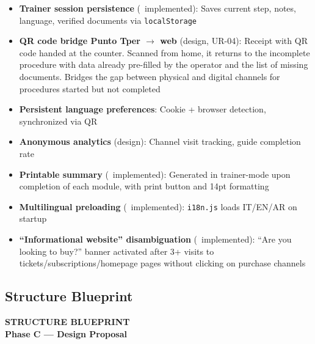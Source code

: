 ﻿\documentclass[11pt,a4paper]{article}
\begin{document}
\begin{tcolorbox}[rffield]
\small
\begin{itemize}[nosep]
  \item \textbf{Trainer session persistence} (\checkmark\ implemented): Saves current step, notes, language, verified documents via \texttt{localStorage}
  \item \textbf{QR code bridge Punto Tper $\rightarrow$ web} (design, UR-04): Receipt with QR code handed at the counter. Scanned from home, it returns to the incomplete procedure with data already pre-filled by the operator and the list of missing documents. Bridges the gap between physical and digital channels for procedures started but not completed
  \item \textbf{Persistent language preferences}: Cookie + browser detection, synchronized via QR
  \item \textbf{Anonymous analytics} (design): Channel visit tracking, guide completion rate
  \item \textbf{Printable summary} (\checkmark\ implemented): Generated in trainer-mode upon completion of each module, with print button and 14pt formatting
  \item \textbf{Multilingual preloading} (\checkmark\ implemented): \texttt{i18n.js} loads IT/EN/AR on startup
  \item \textbf{``Informational website'' disambiguation} (\checkmark\ implemented): ``Are you looking to buy?'' banner activated after 3+ visits to tickets/subscriptions/homepage pages without clicking on purchase channels
\end{itemize}
\end{tcolorbox}

\vspace{0.3cm}


\newpage

\subsection{Structure Blueprint}

\begin{tcolorbox}[headerbox]
 \color{white}\LARGE\bfseries\sffamily STRUCTURE BLUEPRINT \\[0.1cm]
 \color{white!80}\small\sffamily Phase C --- Design Proposal
\end{tcolorbox}

\vspace{0.3cm}
\end{document}
